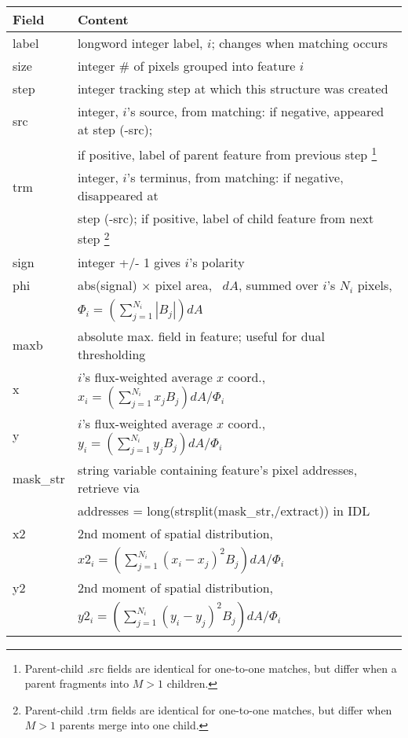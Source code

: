\documentclass[12pt,preprint]{aastex}
\begin{document}
\begin{minipage}[t]{6.0in}
\begin{tabular}{|l|l|} \hline \label{tab:strct} 
  {\bf Field}
& {\bf Content} \\ \hline
%
label & longword integer label, $i$; changes when matching occurs \\ \hline
%
size & integer \# of pixels grouped into feature $i$ \\ \hline 
%
step & integer tracking step at which this structure was created \\ \hline
%
src & integer, $i$'s source, from matching: if negative, appeared at 
step (-src); \\
& if positive, label of parent feature from previous step
\footnote{\footnotesize 
Parent-child .src fields are identical for one-to-one matches, 
but differ when a parent fragments into $M>1$ children.}
\\ \hline
%
trm & integer, $i$'s terminus, from matching: if negative, disappeared at \\ 
& step (-src); if positive, label of child feature from next step 
\protect
\footnote{\footnotesize
Parent-child .trm fields are identical for one-to-one matches, 
but differ when $M>1$ parents merge into one child.}  
\\ \hline
%
sign & integer +/- 1 gives $i$'s polarity \\ \hline
%
phi & abs(signal) $\times$ pixel area, \, $dA$, summed over $i$'s
$N_i$ pixels, \\
& $\Phi_i = (\sum_{j=1}^{N_i} |B_j|) dA $ \\ \hline
%
maxb & absolute max. field in feature; useful for dual thresholding \\ \hline
%
x & $i$'s flux-weighted average $x$ coord., $x_i = (\sum_{j=1}^{N_i} x_j
B_j) dA/ \Phi_i$ \\ \hline
%
y & $i$'s flux-weighted average $x$ coord., $y_i = (\sum_{j=1}^{N_i} y_j
B_j) dA/ \Phi_i$ \\ \hline
%
mask\_str & string variable containing feature's pixel addresses, 
retrieve via \\
& addresses = long(strsplit(mask\_str,/extract)) in IDL \\ \hline
%
x2 & 2nd moment of spatial distribution, \\
& $x2_i = (\sum_{j=1}^{N_i} (x_i - x_j)^2 B_j) dA/ \Phi_i$ \\ \hline
%
y2 & 2nd moment of spatial distribution, \\
& $y2_i = (\sum_{j=1}^{N_i} (y_i - y_j)^2 B_j) dA/ \Phi_i$ \\ \hline

\end{tabular}
\end{minipage}
\end{document}
